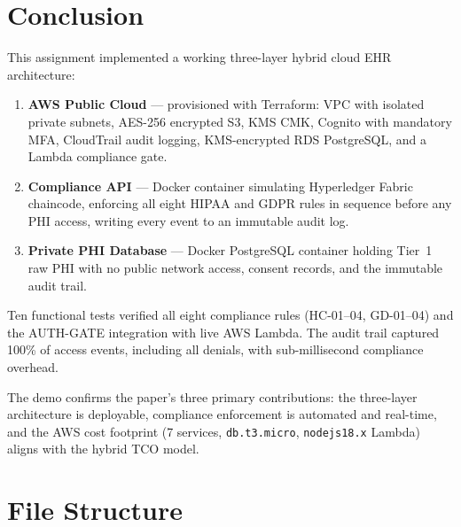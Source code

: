 \documentclass[12pt,a4paper]{article}
\begin{document}
\section{Conclusion}

This assignment implemented a working three-layer hybrid cloud EHR architecture:

\begin{enumerate}
  \item \textbf{AWS Public Cloud} --- provisioned with Terraform: VPC with isolated
        private subnets, AES-256 encrypted S3, KMS CMK, Cognito with mandatory MFA,
        CloudTrail audit logging, KMS-encrypted RDS PostgreSQL, and a Lambda
        compliance gate.

  \item \textbf{Compliance API} --- Docker container simulating Hyperledger Fabric
        chaincode, enforcing all eight HIPAA and GDPR rules in sequence before any
        PHI access, writing every event to an immutable audit log.

  \item \textbf{Private PHI Database} --- Docker PostgreSQL container holding
        Tier~1 raw PHI with no public network access, consent records, and the
        immutable audit trail.
\end{enumerate}

Ten functional tests verified all eight compliance rules (HC-01--04, GD-01--04)
and the AUTH-GATE integration with live AWS Lambda. The audit trail captured 100\%
of access events, including all denials, with sub-millisecond compliance overhead.

The demo confirms the paper's three primary contributions: the three-layer
architecture is deployable, compliance enforcement is automated and real-time, and
the AWS cost footprint (7 services, \texttt{db.t3.micro}, \texttt{nodejs18.x}
Lambda) aligns with the hybrid TCO model.

\appendix
\section{File Structure}
\end{document}
